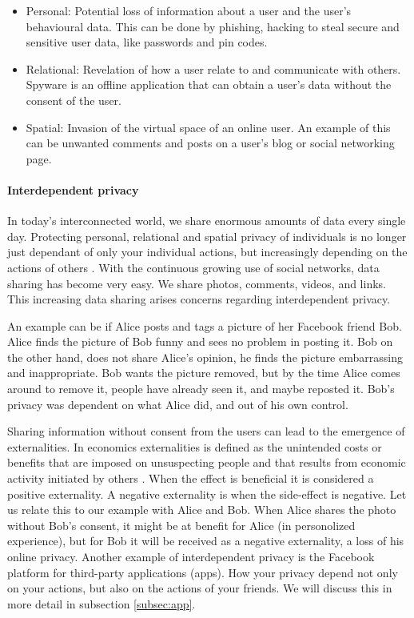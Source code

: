 \begin{itemize} 
\item Personal: Potential loss of information about a user and the user's behavioural data. This can be done by phishing, hacking to steal secure and sensitive user data, like passwords and pin codes.
\item Relational: Revelation of how a user relate to and communicate with others. Spyware is an offline application that can obtain a user's data without the consent of the user. 
\item Spatial: Invasion of  the virtual space of an online user. An example of this can be unwanted comments and posts on a user's blog or social networking page.
\end{itemize}

\paragraph{Interdependent privacy}
In today's interconnected world, we share enormous amounts of data every single day. Protecting personal, relational and spatial privacy of individuals is no longer just dependant of only your individual actions, but increasingly depending on the actions of others \cite{InterdependetPriv}. With the continuous growing use of social networks, data sharing has become very easy. We share photos, comments, videos, and links. This increasing data sharing arises concerns regarding interdependent privacy. 
 
An example can be if Alice posts and tags a picture of her Facebook friend Bob. Alice finds the picture of Bob funny and sees no problem in posting it. Bob on the other hand, does not share Alice's opinion, he finds the picture embarrassing and inappropriate. Bob wants the picture removed, but by the time Alice comes around to remove it, people have already seen it, and maybe reposted it. Bob's privacy was dependent on what Alice did, and out of his own control. 
 
Sharing information without consent from the users can lead to the emergence of externalities. In economics externalities is defined as the unintended costs or benefits that are imposed on unsuspecting people and that results from economic activity initiated by others \cite{externalityDef}. When the effect is beneficial it is considered a positive externality. A negative externality is when the side-effect is negative. Let us relate this to our example with Alice and Bob. When Alice shares the photo without Bob's consent, it might be at benefit for Alice (in personolized experience), but for Bob it will be received as a negative externality, a loss of his online privacy.  
Another example of interdependent privacy is the Facebook platform for third-party applications (apps). How your privacy depend not only on your actions, but also on the actions of your friends. We will discuss this in more detail in subsection \ref{subsec:app}.   


